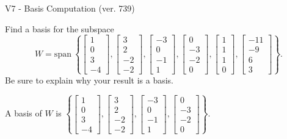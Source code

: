 \begin{exercise}
  \begin{exerciseTitle}V7 - Basis Computation (ver. 739)\end{exerciseTitle}
  \begin{exerciseStatement}
    Find a basis for the subspace 
\[W=\mathrm{span}\ \left\{\left[\begin{array}{r}
1 \\
0 \\
3 \\
-4
\end{array}\right] , \left[\begin{array}{r}
3 \\
2 \\
-2 \\
-2
\end{array}\right] , \left[\begin{array}{r}
-3 \\
0 \\
-1 \\
1
\end{array}\right] , \left[\begin{array}{r}
0 \\
-3 \\
-2 \\
0
\end{array}\right] , \left[\begin{array}{r}
1 \\
1 \\
1 \\
0
\end{array}\right] , \left[\begin{array}{r}
-11 \\
-9 \\
6 \\
3
\end{array}\right]\right\}.\]
 Be sure to explain why your result is a basis.


  \end{exerciseStatement}
  \begin{exerciseAnswer}
   A basis of \(W\) is  \(\left\{\left[\begin{array}{r}
1 \\
0 \\
3 \\
-4
\end{array}\right] , \left[\begin{array}{r}
3 \\
2 \\
-2 \\
-2
\end{array}\right] , \left[\begin{array}{r}
-3 \\
0 \\
-1 \\
1
\end{array}\right] , \left[\begin{array}{r}
0 \\
-3 \\
-2 \\
0
\end{array}\right]\right\}\).
  


  \end{exerciseAnswer}
\end{exercise}